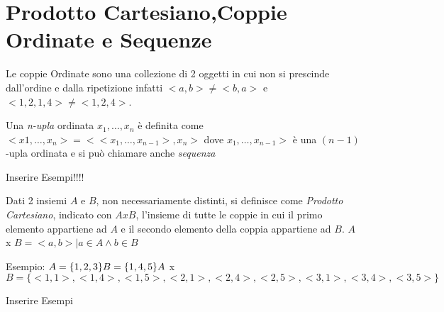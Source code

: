 \section{Prodotto Cartesiano,Coppie Ordinate e Sequenze}
Le coppie Ordinate sono una collezione di 2 oggetti in cui non si prescinde
dall'ordine e dalla ripetizione infatti $<a,b> \neq <b,a>$ e $<1,2,1,4> \neq <1,2,4>$.

Una \emph{n-upla} ordinata $x_1,\dots,x_n$ è definita come $<x1,\dots,x_n> = < <x_1,\dots,x_{n-1}>,x_n>$
dove $x_1,\dots,x_{n-1}>$ è una $(n-1)$-upla ordinata e si può chiamare anche \emph{sequenza}

Inserire Esempi!!!!

Dati 2 insiemi $A$ e $B$, non necessariamente  distinti, si definisce come \textit{Prodotto Cartesiano},
indicato con $A x B$, l'insieme di tutte le coppie in cui il primo elemento appartiene ad $A$
e il secondo elemento della coppia appartiene ad $B$.\newline
$A$ x $B = {<a,b> | a \in A \land b \in B} $

Esempio:\newline
$A = \{1,2,3\} \newline
B = \{1,4,5\} \newline
A$ x $B = \{<1,1>,<1,4>,<1,5>,<2,1>,<2,4>,<2,5>,<3,1>,<3,4>,<3,5>\} $


Inserire Esempi
